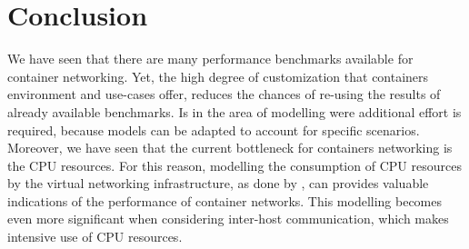 \documentclass[conference]{IEEEtran}
\begin{document}
%





\section{Conclusion}
We have seen that there are many performance benchmarks available for container networking. Yet, the high degree of customization that containers environment and use-cases offer, reduces the chances of re-using the results of already available benchmarks. Is in the area of modelling were additional effort is required, because models can be adapted to account for specific scenarios. Moreover, we have seen that the  current bottleneck for containers networking is the CPU resources. For this reason, modelling the consumption of CPU resources by the virtual networking infrastructure, as done by \cite{ANCS:Gallenmüller}, can provides valuable indications of the performance of container networks. This modelling becomes even more significant when considering inter-host communication, which makes intensive use of CPU resources.
\end{document}
